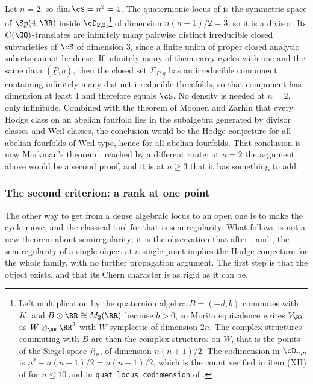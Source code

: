 \begin{remark}[At $n=2$ the hypothesis is weaker still]\label{rem:ntwo}
Let $n=2$, so $\dim\cS=n^{2}=4$. The quaternionic locus of
 is the symmetric space of $\Sp(4,\RR)$ inside
$\cD_{2,2}$,\footnote{Left multiplication by the quaternion algebra
$B=(-d,b)$ commutes with $K$, and $B\otimes\RR\cong M_{2}(\RR)$ because
$b>0$, so Morita equivalence writes $V_{\RR}$ as $W\otimes_{\RR}\RR^{2}$ with
$W$ symplectic of dimension $2n$. The complex structures commuting with $B$
are then the complex structures on $W$, that is the points of the Siegel
space $\mathfrak{H}_{n}$, of dimension $n(n+1)/2$. The codimension in
$\cD_{n,n}$ is $n^{2}-n(n+1)/2=n(n-1)/2$, which is the count verified in
item (XII) of  for $n\le10$ and in
\texttt{quat\_locus\_codimension} of .} of dimension
$n(n+1)/2=3$, so it is a divisor. Its $G(\QQ)$-translates are infinitely many
pairwise distinct irreducible closed subvarieties of $\cS$ of dimension $3$,
since a finite union of proper closed analytic subsets cannot be dense. If
infinitely many of them carry cycles with one and the same data
$(\underline{P},\underline{q})$, then the closed set
$\Sigma_{\underline{P},\underline{q}}$ has an irreducible component containing
infinitely many distinct irreducible threefolds, so that component has
dimension at least $4$ and therefore equals $\cS$. No density is needed at
$n=2$, only infinitude. Combined with the theorem of Moonen and Zarhin
\cite{MZ99} that every Hodge class on an abelian fourfold lies in the
subalgebra generated by divisor classes and Weil classes, the conclusion would
be the Hodge conjecture for all abelian fourfolds of Weil type, hence for all
abelian fourfolds. That conclusion is now Markman's theorem
\cite[Corollary 1.6.1]{Mar25a}, reached by a different route; at $n=2$ the
argument above would be a second proof, and it is at $n\ge3$ that it has
something to add.
\end{remark}

\subsubsection*{The second criterion: a rank at one point}

The other way to get from a dense algebraic locus to an open one is to make
the cycle move, and the classical tool for that is semiregularity. What
follows is not a new theorem about semiregularity; it is the observation that
after ,  and ,
the semiregularity of a single object at a single point implies the Hodge
conjecture for the whole family, with no further propagation argument. The
first step is that the object exists, and that its Chern character is as rigid
as it can be.

